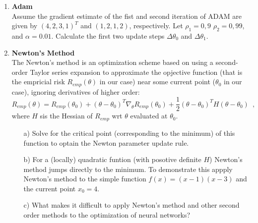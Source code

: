 \documentclass[paper=a4, fontsize=11pt]{scrartcl} %
\numberwithin{equation}{section} %
\numberwithin{figure}{section} %
\numberwithin{table}{section} %
\begin{document}
\begin{enumerate}
\item\textbf{Adam}\\
Assume the gradient estimate of the fist and second iteration of ADAM are given by $(4,2,3,1)^T$ and $(1,2,1,2)$, respectively. Let $\rho_1=0,9$  $\rho_2=0,99$, and $\alpha=0.01$. Calculate the first two update steps $\Delta \theta_0$ and $\Delta \theta_1$.

\item\textbf{Newton's Method}\\
The Newton's method is an optimization scheme based on using a second-order Taylor series expansion to approximate the opjective function (that is the empricial risk $R_{emp}(\theta)$ in our case) near some current point ($\theta_0$ in our case), ignoring derivatives of higher order:
$$
R_{emp}(\theta)=R_{emp}(\theta_0)+ (\theta - \theta_0)^T \nabla_{\theta} R_{emp}(\theta_0) + \frac{1}{2} (\theta - \theta_0)^T H (\theta - \theta_0)\enspace,
$$
where $H$ sis the Hessian of $R_{emp}$ wrt $\theta$ evaluated at $\theta_0$.
\begin{itemize}
\item[a)]Solve for the critical point (corresponding to the minimum) of this function to optain the Newton parameter update rule.
\item[b)] For a (locally) quadratic funtion (with posotive definite $H$) Newton's method jumps directly to the minimum. To demonstrate this appply Newton's method to the simple function $f(x)=(x-1)(x-3)$ and the current point $x_0=4$.   
\item[c)] What makes it difficult to apply Newton's method and other second order methods to the optimization of neural networks?
\end{itemize}

\end{enumerate}


\end{document}
